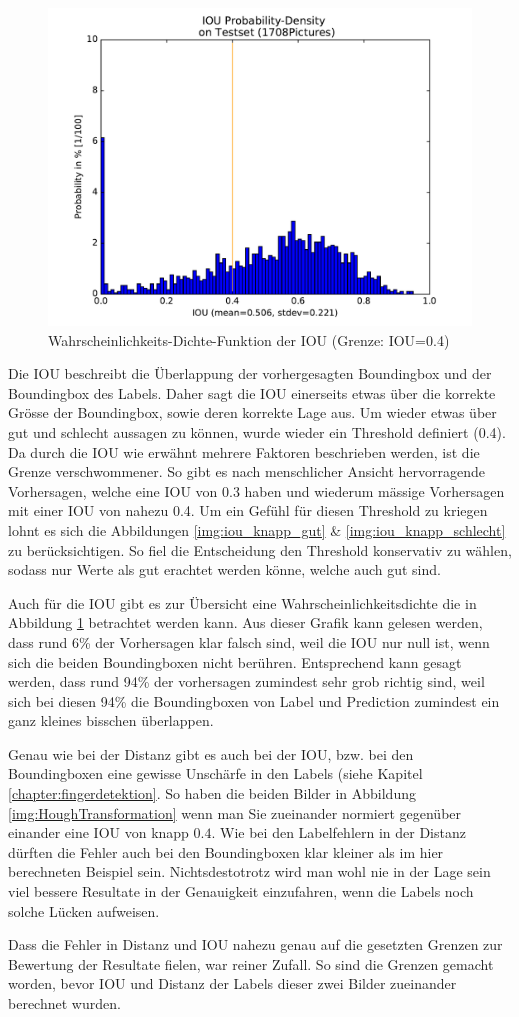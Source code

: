 \begin{figure}
	\centering
	\includegraphics[width=.7\textwidth]{Kapitel/70Resultate/Bilder/IOUprobDensity.pdf}
	\caption{Wahrscheinlichkeits-Dichte-Funktion der IOU (Grenze: IOU=0.4)}
	\label{img:iou_dichte}
\end{figure}


Die IOU beschreibt die Überlappung der vorhergesagten Boundingbox und der Boundingbox des Labels. 
Daher sagt die IOU einerseits etwas über die korrekte Grösse der Boundingbox, sowie deren korrekte Lage aus. 
Um wieder etwas über gut und schlecht aussagen zu können, wurde wieder ein Threshold definiert (0.4).
Da durch die IOU wie erwähnt mehrere Faktoren beschrieben werden, ist die Grenze verschwommener. 
So gibt es nach menschlicher Ansicht hervorragende Vorhersagen, welche eine IOU von 0.3 haben und wiederum mässige Vorhersagen mit einer IOU von nahezu 0.4.
Um ein Gefühl für diesen Threshold zu kriegen lohnt es sich die Abbildungen \ref{img:iou_knapp_gut} \& \ref{img:iou_knapp_schlecht} zu berücksichtigen.
So fiel die Entscheidung den Threshold konservativ zu wählen, sodass nur Werte als gut erachtet werden könne, welche auch gut sind. 

Auch für die IOU gibt es zur Übersicht eine Wahrscheinlichkeitsdichte die in Abbildung \ref{img:iou_dichte} betrachtet werden kann.
Aus dieser Grafik kann gelesen werden, dass rund 6\% der Vorhersagen klar falsch sind, weil die IOU nur null ist, wenn sich die beiden Boundingboxen nicht berühren. Entsprechend kann gesagt werden, dass rund 94\% der vorhersagen zumindest sehr grob richtig sind, weil sich bei diesen 94\% die Boundingboxen von Label und Prediction zumindest ein ganz kleines bisschen überlappen. 

Genau wie bei der Distanz gibt es auch bei der IOU, bzw. bei den Boundingboxen eine gewisse Unschärfe in den Labels (siehe Kapitel \ref{chapter:fingerdetektion}.
So haben die beiden Bilder in Abbildung \ref{img:HoughTransformation} wenn man Sie zueinander normiert gegenüber einander eine IOU von knapp $0.4$.
Wie bei den Labelfehlern in der Distanz dürften die Fehler auch bei den Boundingboxen klar kleiner als im hier berechneten Beispiel sein.
Nichtsdestotrotz wird man wohl nie in der Lage sein viel bessere Resultate in der Genauigkeit einzufahren, wenn die Labels noch solche Lücken aufweisen.

Dass die Fehler in Distanz und IOU nahezu genau auf die gesetzten Grenzen zur Bewertung der Resultate fielen, war reiner Zufall.
So sind die Grenzen gemacht worden, bevor IOU und Distanz der Labels dieser zwei Bilder zueinander berechnet wurden.



